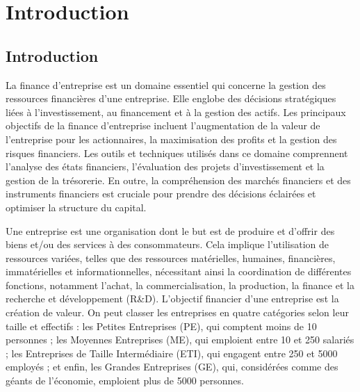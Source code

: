 \documentclass[a4paper, 12pt]{report}
\begin{document}
\chapter*{Introduction}	

\section{Introduction}

La finance d'entreprise est un domaine essentiel qui concerne la gestion des ressources financières d'une entreprise. Elle englobe des décisions stratégiques liées à l'investissement, au financement et à la gestion des actifs. Les principaux objectifs de la finance d'entreprise incluent l'augmentation de la valeur de l'entreprise pour les actionnaires, la maximisation des profits et la gestion des risques financiers. Les outils et techniques utilisés dans ce domaine comprennent l'analyse des états financiers, l'évaluation des projets d'investissement et la gestion de la trésorerie. En outre, la compréhension des marchés financiers et des instruments financiers est cruciale pour prendre des décisions éclairées et optimiser la structure du capital.

Une entreprise est une organisation dont le but est de produire et d'offrir des biens et/ou des services à des consommateurs. Cela implique l'utilisation de ressources variées, telles que des ressources matérielles, humaines, financières, immatérielles et informationnelles, nécessitant ainsi la coordination de différentes fonctions, notamment l'achat, la commercialisation, la production, la finance et la recherche et développement (R\&D). L'objectif financier d'une entreprise est la création de valeur. On peut classer les entreprises en quatre catégories selon leur taille et effectifs : les Petites Entreprises (PE), qui comptent moins de 10 personnes ; les Moyennes Entreprises (ME), qui emploient entre 10 et 250 salariés ; les Entreprises de Taille Intermédiaire (ETI), qui engagent entre 250 et 5000 employés ; et enfin, les Grandes Entreprises (GE), qui, considérées comme des géants de l'économie, emploient plus de 5000 personnes.
\end{document}
